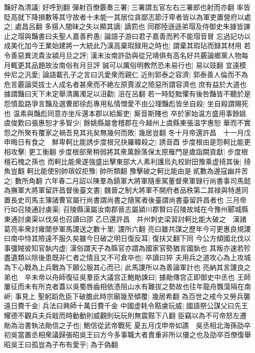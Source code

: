 豔好為清議|{
	好呼到翻}
彈射百僚覈奏三署|{
	三署謂五官左右三署郎也射而亦翻}
率皆貶高就下降損數等其守故者十未能一其居位貪鄙志節汙卑者皆以為軍吏置營府以處之|{
	處昌呂翻}
多揚人闇昧之失以顯其謫|{
	謫罰也}
同郡陸遜遜弟瑁及侍御史朱據皆諫止之瑁與豔書曰夫聖人嘉善矜愚|{
	論語子游曰君子嘉善而矜不能瑁音冒}
忘過記功以成美化加今王業始建將一大統此乃漢高棄瑕録用之時也|{
	謂棄其瑕玷而録其材用}
若令善惡異流貴汝潁月旦之評|{
	漢末汝南許劭與從兄靖俱有高名好共覈論鄉黨人物每月輒更其品題故汝南俗有月旦評}
誠可以厲俗明教然恐未易行也|{
	易以豉翻}
宜遠模仲尼之汎愛|{
	論語載孔子之言曰汎愛衆而親仁}
近則郭泰之容濟|{
	郭泰善人倫而不為危言覈論奨拔士人成名者甚衆而不絶左原賈淑之險惡所謂容濟也}
庶有益於大道也據謂豔曰天下未定舉清厲濁足以沮勸|{
	沮在呂翻}
若一時貶黜懼有後咎豔皆不聽於是怨憤盈路爭言豔及選曹郎徐彪專用私情憎愛不由公理豔彪皆坐自殺|{
	坐自殺謂賜死也}
温素與豔彪同意亦坐斥還本郡以給厮吏|{
	厮音斯賤也}
卒於家始温方盛用事餘姚虞俊歎曰張惠恕才多智少|{
	餘姚縣屬會稽郡在今越州上虞縣東張温字惠恕}
華而不實怨之所聚有覆家之禍吾見其兆矣無幾何而敗|{
	幾居豈翻}
冬十月帝還許昌　十一月戊申晦日有食之　鮮卑軻比能誘步度根兄抉羅韓殺之|{
	誘音酉}
步度根由是怨軻比能更相攻擊|{
	更工衡翻}
步度根部衆稍弱將其衆萬餘落保太原雁門是歲詣闕貢獻|{
	步度根檀石槐之孫也}
而軻比能衆遂強盛出擊東部大人素利護烏丸校尉田豫乘虚掎其後|{
	掎魚豈翻}
軻比能使别帥瑣奴拒豫|{
	帥所類翻}
豫擊破之軻比能由是貳數為邊寇幽并苦之|{
	數所角翻}
六年春二月詔以陳羣為鎮軍大將軍隨車駕董督衆軍録行尚書事司馬懿為撫軍大將軍留許昌督後臺文書|{
	魏晉之制大將軍不開府者品秩第二其禄與特進同置長史司馬主簿諸曹官屬行尚書謂尚書之隨駕者後臺謂尚書臺留許昌者也}
三月帝行如召陵通討虜渠|{
	召陵縣漢屬汝南郡晉志屬潁川郡賢曰召陵故城在今豫州郾城縣東通討虜渠以伐吳也召讀曰邵}
乙巳還許昌　并州刺史梁習討軻比能大破之　漢諸葛亮率衆討雍闓參軍馬謖送之數十里|{
	謖所六翻}
亮曰雖共謀之歷年今可更惠良規謖曰南中恃其險遠不服久矣雖今日破之明日復反耳|{
	復扶又翻下同}
今公方傾國北伐以事彊賊彼知官埶内虚|{
	漢俗謂天子為縣官亦謂為國家官勢猶言國埶也}
其叛亦速若殄盡遺類以除後患既非仁者之情且又不可倉卒也|{
	卒讀曰猝}
夫用兵之道攻心為上攻城為下心戰為上兵戰為下願公服其心而已|{
	此馬謖所以為善論軍計也}
亮納其言謖良之弟也　辛未帝以舟師復征吳羣臣大議宫正鮑勛諫曰|{
	據勛傳宫正即御史中丞也}
王師屢征而未有所克者蓋以吳蜀唇齒相依憑阻山水有難拔之勢故也往年龍舟飄蕩隔在南㟁|{
	事見上}
聖躬蹈危臣下破膽此時宗廟幾至傾覆|{
	幾居希翻}
為百世之戒今又勞兵襲遠日費千金|{
	兵法曰興師十萬日費千金}
中國虚耗令黠虜玩威|{
	國語祭公謀父曰先王耀德不觀兵夫兵戢而時動動則威觀則玩玩則無震黠下八翻}
臣竊以為不可帝怒左遷勛為治書執法勛信之子也|{
	鮑信從武帝戰死}
夏五月戊申帝如譙　吳丞相北海孫劭卒初吳當置丞相衆議歸張昭吳王曰方今多事職大者責重非所以優之也及劭卒百僚復舉昭吳王曰孤豈為子布有愛乎|{
	為于偽翻}
